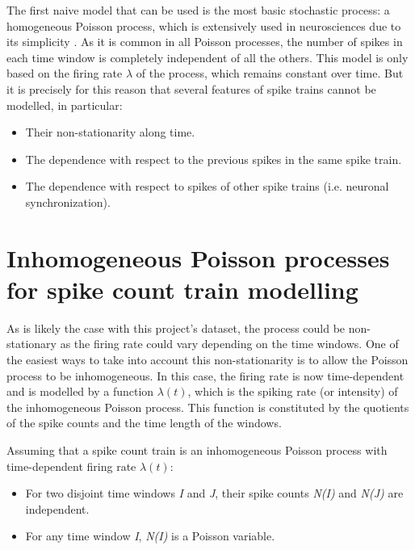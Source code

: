 \documentclass{kththesis}
\begin{document}
The first naive model that can be used is the most basic stochastic process: a homogeneous Poisson process, which is extensively used in neurosciences due to its simplicity \parencite{Gerstner}. 
As it is common in all Poisson processes, the number of spikes in each time window is completely independent of all the others. 
This model is only based on the firing rate \begin{math}\lambda\end{math} of the process, which remains constant over time. 
But it is precisely for this reason that several features of spike trains cannot be modelled, in particular: 

\begin{itemize}
    \item Their non-stationarity along time.
    \item The dependence with respect to the previous spikes in the same spike train.
    \item The dependence with respect to spikes of other spike trains (i.e. neuronal synchronization).
\end{itemize}

\section{Inhomogeneous Poisson processes for spike count train modelling}

As is likely the case with this project's dataset, the process could be non-stationary as the firing rate could vary depending on the time windows. 
One of the easiest ways to take into account this non-stationarity is to allow the Poisson process to be inhomogeneous. 
In this case, the firing rate is now time-dependent and is modelled by a function \begin{math}\lambda(t)\end{math}, which is the spiking rate (or intensity) of the inhomogeneous Poisson process. 
This function is constituted by the quotients of the spike counts and the time length of the windows.

Assuming that a spike count train is an inhomogeneous Poisson process with time-dependent firing rate \begin{math}\lambda(t)\end{math}:

\begin{itemize}
    \item For two disjoint time windows \textit{I} and \textit{J}, their spike counts \textit{N(I)} and \textit{N(J)} are independent.
    \item For any time window \textit{I}, \textit{N(I)} is a Poisson variable.
\end{itemize}
\end{document}
